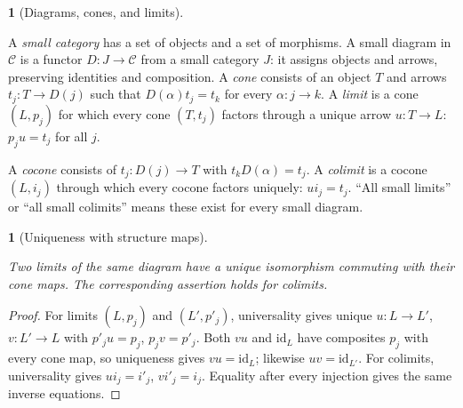 \documentclass[11pt,a4paper]{article}
\newcommand{\mathheading}{}
\theoremstyle{plain}
\newtheorem*{plainstatement}{\mathheading}
\theoremstyle{definition}
\newtheorem*{definitionstatement}{\mathheading}
\newenvironment{mathstatement}[3]{\renewcommand{\mathheading}{#1 #2}\begin{plainstatement}[#3]}{\end{plainstatement}}
\newenvironment{mathdefinition}[3]{\renewcommand{\mathheading}{#1 #2}\begin{definitionstatement}[#3]}{\end{definitionstatement}}
\begin{document}
\begin{mathdefinition}{Definition}{2.1}{Diagrams, cones, and limits}
\label{env-2-1}

A \emph{small category} has a set of objects and a set of morphisms. A small diagram in \(\mathcal C\) is a functor \(D:J\to\mathcal C\) from a small category \(J\): it assigns objects and arrows, preserving identities and composition. A \emph{cone} consists of an object \(T\) and arrows \(t_j:T\to D(j)\) such that \(D(\alpha)t_j=t_k\) for every \(\alpha:j\to k\). A \emph{limit} is a cone \((L,p_j)\) for which every cone \((T,t_j)\) factors through a unique arrow \(u:T\to L\): \(p_ju=t_j\) for all \(j\).

 
A \emph{cocone} consists of \(t_j:D(j)\to T\) with \(t_kD(\alpha)=t_j\). A \emph{colimit} is a cocone \((L,i_j)\) through which every cocone factors uniquely: \(ui_j=t_j\). ``All small limits'' or ``all small colimits'' means these exist for every small diagram.


\par{}\par

\end{mathdefinition}
 
\begin{mathstatement}{Proposition}{2.2}{Uniqueness with structure maps}
\label{env-2-2}

Two limits of the same diagram have a unique isomorphism commuting with their cone maps. The corresponding assertion holds for colimits.


\par{}\par

\end{mathstatement}
 
\begin{proof}

For limits \((L,p_j)\) and \((L',p'_j)\), universality gives unique \(u:L\to L'\), \(v:L'\to L\) with \(p'_ju=p_j\), \(p_jv=p'_j\). Both \(vu\) and \(\mathrm{id}_L\) have composites \(p_j\) with every cone map, so uniqueness gives \(vu=\mathrm{id}_L\); likewise \(uv=\mathrm{id}_{L'}\). For colimits, universality gives \(u i_j=i'_j\), \(v i'_j=i_j\). Equality after every injection gives the same inverse equations.


\end{proof}
 
\end{document}
